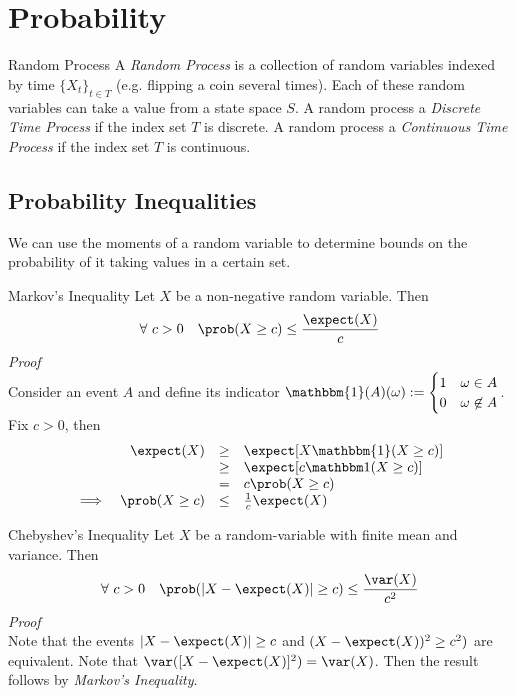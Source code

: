 \documentclass[11pt,a4paper]{article}
\begin{document}
\section{Probability}

\begin{definition}{Random Process}
  A \textit{Random Process} is a collection of random variables indexed by time $\{X_t\}_{t\in T}$ (e.g. flipping a coin several times). Each of these random variables can take a value from a state space $S$. A random process a \textit{Discrete Time Process} if the index set $T$ is discrete. A random process a \textit{Continuous Time Process} if the index set $T$ is continuous.
\end{definition}

\subsection{Probability Inequalities}

\begin{remark}{We can use the moments of a random variable to determine bounds on the probability of it taking values in a certain set.}
\end{remark}

\begin{theorem}{Markov's Inequality}
  Let $X$ be a non-negative random variable. Then
  \[ \forall\ c>0\quad\prob(X\geq c)\leq\frac{\expect(X)}c \]
  \textit{Proof}\\
  Consider an event $A$ and define its indicator $\mathbbm{1}(A)(\omega):=\begin{cases}1&\omega\in A\\0&\omega\not\in A\end{cases}$. Fix $c>0$, then
  \[\begin{array}{rrcl}
    &\expect(X)&\geq&\expect[X\mathbbm{1}(X\geq c)]\\
    &&\geq&\expect[c\mathbbm1(X\geq c)]\\
    &&=&c\prob(X\geq c)\\
    \implies&\prob(X\geq c)&\leq&\frac1c\expect(X)
  \end{array}\]
\end{theorem}

\begin{theorem}{Chebyshev's Inequality}
  Let $X$ be a random-variable with finite mean and variance. Then
  \[ \forall\ c>0\quad\prob(|X-\expect(X)|\geq c)\leq\frac{\var(X)}{c^2}\]
  \textit{Proof}\\
  Note that the events $|X-\expect(X)|\geq c$ and $(X-\expect(X))^2\ge c^2)$ are equivalent. Note that $\var([X-\expect(X)]^2)=\var(X)$. Then the result follows by \textit{Markov's Inequality}.
\end{theorem}
\end{document}
